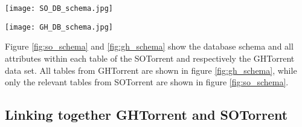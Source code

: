       
        \begin{figure*}[!h]
          \centering
          \texttt{[image: SO\_DB\_schema.jpg]}\\
          \label{fig:so_schema}
        \end{figure*}
        
   
        \begin{figure*}[!h]
          \centering
          \texttt{[image: GH\_DB\_schema.jpg]}\\
          \label{fig:gh_schema}
        \end{figure*}
        
        Figure \ref{fig:so_schema} and \ref{fig:gh_schema} show the database schema and all attributes within each table of the SOTorrent and respectively the GHTorrent data set. All tables from GHTorrent are shown in figure \ref{fig:gh_schema}, while only the relevant tables from SOTorrent are shown in figure \ref{fig:so_schema}. 


    \subsection{Linking together GHTorrent and SOTorrent}\label{Linking_SO_GH}
    
